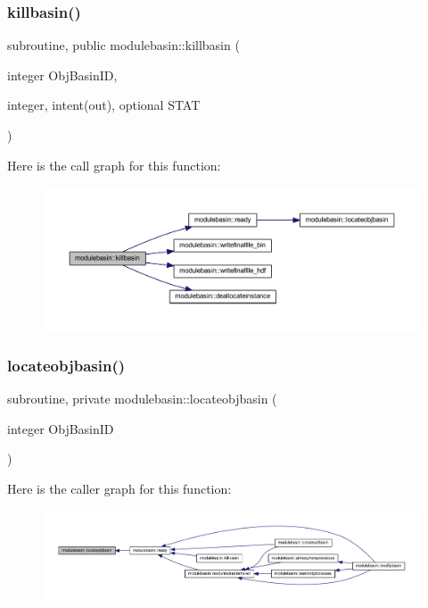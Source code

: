 \subsubsection{\texorpdfstring{killbasin()}{killbasin()}}
{\footnotesize\ttfamily subroutine, public modulebasin\+::killbasin (\begin{DoxyParamCaption}\item[{integer}]{Obj\+Basin\+ID,  }\item[{integer, intent(out), optional}]{S\+T\+AT }\end{DoxyParamCaption})}

Here is the call graph for this function\+:\nopagebreak
\begin{figure}[H]
\begin{center}
\leavevmode
\includegraphics[width=350pt]{namespacemodulebasin_a766c9c7d623f8a8392b3ed324921f71c_cgraph}
\end{center}
\end{figure}
\mbox{\label{namespacemodulebasin_a44bb775ef055614008b8afd7ca4b77f4}} 
\subsubsection{\texorpdfstring{locateobjbasin()}{locateobjbasin()}}
{\footnotesize\ttfamily subroutine, private modulebasin\+::locateobjbasin (\begin{DoxyParamCaption}\item[{integer}]{Obj\+Basin\+ID }\end{DoxyParamCaption})\hspace{0.3cm}{\ttfamily [private]}}

Here is the caller graph for this function\+:\nopagebreak
\begin{figure}[H]
\begin{center}
\leavevmode
\includegraphics[width=350pt]{namespacemodulebasin_a44bb775ef055614008b8afd7ca4b77f4_icgraph}
\end{center}
\end{figure}
\mbox{\label{namespacemodulebasin_a5ce7ee123ed0331d3bcb0ba4db4a9797}} 
